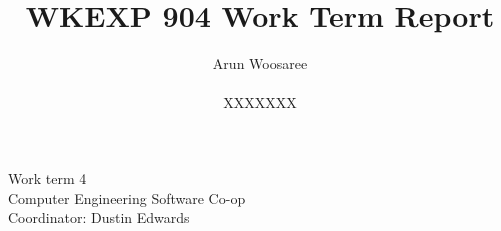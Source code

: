 \documentclass[letterpaper,12pt]{article}
\title{WKEXP 904 Work Term Report}
\author{Arun Woosaree \\ \\ XXXXXXX}
\begin{document}
\relax
\begin{titlepage}
 \maketitle
 \thispagestyle{empty} %
 \centering
 \large
 \vspace{1cm}
 Work term 4\\
 \vspace{1cm}
 Computer Engineering Software Co-op \\
 \vspace{1cm}
 Coordinator: Dustin Edwards
\end{titlepage}







\singlespacing
\end{document}
